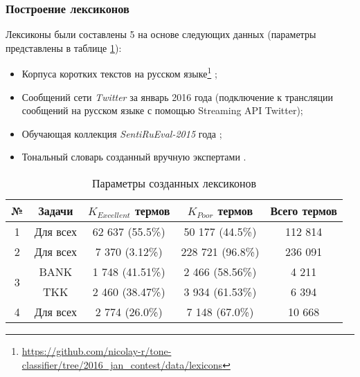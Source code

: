 \subsubsection{Построение лексиконов}

Лексиконы были составлены 5 на основе следующих данных (параметры представлены
в таблице \ref{table:createdLexicons}):

\begin{itemize}
    \item Корпуса коротких текстов на русском языке\footnote{
            \url{https://github.com/nicolay-r/tone-classifier/tree/2016_jan_contest/data/lexicons}
    }
    \cite{rubtsovaCollection};
    \item Сообщений сети {\it Twitter} за январь 2016 года (подключение к трансляции
        сообщений на русском языке с помощью Streaming API Twitter);
    \item Обучающая коллекция {\it SentiRuEval-2015} года \cite{dialog2015};
    \item Тональный словарь созданный вручную экспертами \cite{expertLexicon}.
\end{itemize}

\begin{table}[ht!]
\centering
\caption{Параметры созданных лексиконов}
\label{table:createdLexicons}
\begin{tabular}{|c|c|c|c|c|}
\hline
№                  & \multicolumn{1}{c|}{Задачи} & \multicolumn{1}{c|}{$K_{Excellent}$ термов} & \multicolumn{1}{c|}{$K_{Poor}$ термов} & \multicolumn{1}{c|}{Всего термов} \\ \hline
1                  & Для всех                    & 62 637 (55.5\%)                              & 50 177 (44.5\%)                         & 112 814                            \\ \hline
2                  & Для всех                    & 7 370 (3.12\%)                               & 228 721 (96.8\%)                        & 236 091                            \\ \hline
\multirow{2}{*}{3} & BANK                        & 1 748 (41.51\%)                              & 2 466 (58.56\%)                         & 4 211                              \\ \cline{2-5}
                   & TKK                         & 2 460 (38.47\%)                              & 3 934 (61.53\%)                         & 6 394                              \\ \hline
4                  & Для всех                    & 2 774 (26.0\%)                               & 7 148 (67.0\%)                          & 10 668                             \\ \hline
\end{tabular}
\end{table}

